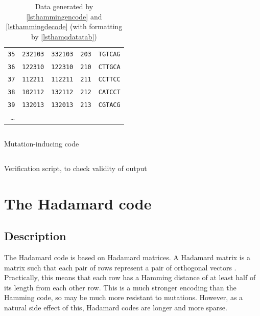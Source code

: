 \documentclass[a4paper,11pt]{article}
\newenvironment{longlisting}
{\addvspace{\baselineskip}\captionsetup{type=listing}}
{\addvspace{\baselineskip}}
\begin{document}
\begin{table}[H]
\begin{center}
\begin{tabular}{rcccc}
\texttt{35} & \texttt{232103} & \texttt{332103} & \texttt{203} & \texttt{TGTCAG} \\
\texttt{36} & \texttt{122310} & \texttt{122310} & \texttt{210} & \texttt{CTTGCA} \\
\texttt{37} & \texttt{112211} & \texttt{112211} & \texttt{211} & \texttt{CCTTCC} \\
\texttt{38} & \texttt{102112} & \texttt{132112} & \texttt{212} & \texttt{CATCCT} \\
\texttt{39} & \texttt{132013} & \texttt{132013} & \texttt{213} & \texttt{CGTACG} \\
\ldots \\
\bottomrule
\end{tabular}
\end{center}
\caption{Data generated by \ref{lsthammingencode} and \ref{lsthammingdecode} (with formatting by
         \ref{lsthamqdatatab})}
\label{tabhamqdata}
\end{table}

\begin{longlisting}
\inputminted{python}{../src/mutate.py}
\caption{Mutation-inducing code}\label{lstmutation}
\end{longlisting}

\begin{longlisting}
\inputminted{python}{../src/verify.py}
\caption{Verification script, to check validity of output}\label{lstverify}
\end{longlisting}

    \section{The Hadamard code}

    \subsection{Description}

    The Hadamard code is based on Hadamard matrices. A Hadamard matrix is a
    matrix such that each pair of rows represent a pair of orthogonal
    \cite{Orthogonal1981Burley} vectors
    \cite{HadamardMatrices1978HedayatWallis}.
    Practically, this means that each row has a Hamming distance of at least
    half of its length from each other row. This is a much stronger encoding
    than the Hamming code, so may be much more resistant to mutations. However,
    as a natural side effect of this, Hadamard codes are longer and more sparse.
\end{document}
